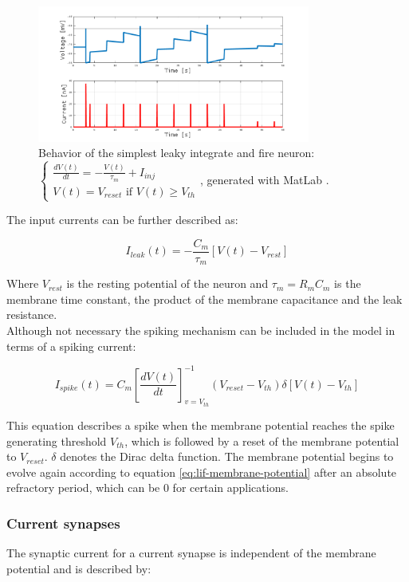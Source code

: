   \begin{figure}
    \centering
    \includegraphics[width=0.8\textwidth]{lif-behavior}
    \caption{Behavior of the simplest leaky integrate and fire neuron: $\begin{cases} \frac{dV(t)}{dt} = -\frac{V(t)}{\tau_m} + I_{inj} \\ V(t) = V_{reset} \text{ if } V(t) \geq V_{th} \end{cases}$, generated with MatLab \cite{matlab}.}
    \label{fig:lif-behavior}
  \end{figure}

  The input currents can be further described as:

  \begin{equation}
    I_{leak}(t) = -\frac{C_m}{\tau_m}\left[V(t) - V_{rest}\right]
  \end{equation}

  Where $V_{rest}$ is the resting potential of the neuron and $\tau_m = R_mC_m$ is the membrane time constant, the product of the membrane capacitance and the leak resistance.\\
  Although not necessary the spiking mechanism can be included in the model in terms of a spiking current:

  \begin{equation}
    I_{spike}(t) = C_m\left[\frac{dV(t)}{dt}\right]^{-1}_{v = V_{th}}\left(V_{reset}-V_{th}\right)\delta\left[V(t)-V_{th}\right]
  \end{equation}

  This equation describes a spike when the membrane potential reaches the spike generating threshold $V_{th}$, which is followed by a reset of the membrane potential to $V_{reset}$.
  $\delta$ denotes the Dirac delta function.
  The membrane potential begins to evolve again according to equation \ref{eq:lif-membrane-potential} after an absolute refractory period, which can be $0$ for certain applications.

    \subsubsection{Current synapses}
    The synaptic current for a current synapse is independent of the membrane potential and is described by:

